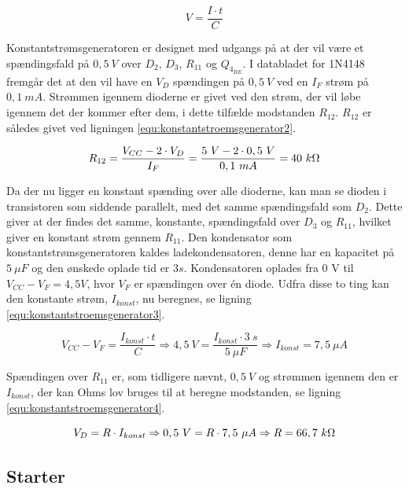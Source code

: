 \begin{equation}
\label{equ:konstantstroemsgenerator1}
V = \frac{I \cdot t}{C}
\end{equation}

Konstantstrømsgeneratoren er designet med udgangs på at der vil være et spændingsfald på $0,5~V$ over $D_2$, $D_3$, $R_{11}$ og $Q_{4_{BE}}$. I databladet for 1N4148 fremgår det at den vil have en $V_D$ spændingen på $0,5~V$ ved en $I_F$ strøm på $0,1~mA$. Strømmen igennem dioderne er givet ved den strøm, der vil løbe igennem det der kommer efter dem, i dette tilfælde modstanden $R_{12}$. $R_{12}$ er således givet ved ligningen \ref{equ:konstantstroemsgenerator2}.

\begin{equation}
\label{equ:konstantstroemsgenerator2}
R_{12} = \frac{V_{CC} - 2 \cdot V_D}{I_F} = \frac{5~V - 2 \cdot 0,5~V}{0,1~mA} = 40~k\ohm
\end{equation}

Da der nu ligger en konstant spænding over alle dioderne, kan man se dioden i transistoren som siddende parallelt, med det samme spændingsfald som $D_2$. Dette giver at der findes det samme, konstante, spændingsfald over $D_3$ og $R_{11}$, hvilket giver en konstant strøm gennem $R_{11}$.
Den kondensator som konstantstrømsgeneratoren kaldes ladekondensatoren, denne har en kapacitet på $5~\mu F$ og den ønskede oplade tid er $3 s$. Kondensatoren oplades fra 0 V til $V_{CC} - V_F = 4,5 V$, hvor $V_F$ er spændingen over én diode. Udfra disse to ting kan den konstante strøm, $I_{konst}$, nu beregnes, se ligning \ref{equ:konstantstroemsgenerator3}.

\begin{equation}
\label{equ:konstantstroemsgenerator3}
V_{CC} - V_F = \frac{I_{konst} \cdot t}{C} \Rightarrow 4,5~V = \frac{I_{konst} \cdot 3~s}{5~\mu F} \Rightarrow I_{konst} = 7,5~\mu A
\end{equation}

Spændingen over $R_{11}$ er, som tidligere nævnt, $0,5~V$ og strømmen igennem den er $I_{konst}$, der kan Ohms lov bruges til at beregne modstanden, se ligning \ref{equ:konstantstroemsgenerator4}.

\begin{equation}
\label{equ:konstantstroemsgenerator4}
V_D = R \cdot I_{konst} \Rightarrow 0,5~ V = R \cdot 7,5~\mu A \Rightarrow R = 66,7~k\ohm
\end{equation}

\subsection{Starter}
\label{volumenkontrol-simulering-starter}


